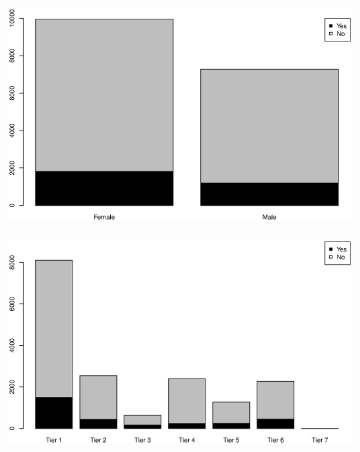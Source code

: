 \documentclass[12pt,english]{report}
\begin{document}
\begin{figure}[p]
\begin{subfigure}{0.48\textwidth}
\includegraphics[width=\linewidth]{pic/grad_gender}
\caption{} \label{grad:a}
\end{subfigure}\hspace*{\fill}
\begin{subfigure}{0.48\textwidth}
\includegraphics[width=\linewidth]{pic/grad_tier}
\caption{} \label{grad:b}
\end{subfigure}


\end{figure}
\end{document}
